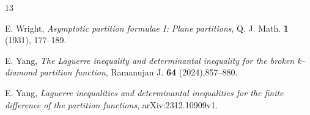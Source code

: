 \documentclass[11pt,reqno,a4paper]{amsart}
\renewcommand{\(}{\left\(}
\renewcommand{\)}{\right\)}
\numberwithin{equation}{section}
\theoremstyle{plain}
\theoremstyle{definition} %
\numberwithin{equation}{section}
\begin{document}
\begin{thebibliography}{13}
		
		 E. Wright, {\it Asymptotic partition formulae I: Plane partitions}, Q. J. Math. {\bf 1} (1931), 177--189.
		
		 E. Yang, {\it The Laguerre inequality and determinantal inequality for the broken $k$-diamond partition function}, Ramanujan J. {\bf 64} (2024),857--880.
		
		 E. Yang, {\it Laguerre inequalities and determinantal inequalities for the finite difference of the partition functions}, arXiv:2312.10909v1.
		
	
		


	\end{thebibliography}
\end{document}
